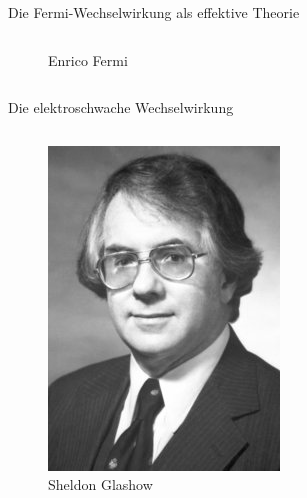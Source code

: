 \documentclass[aspectratio=1610, professionalfonts, 10pt]{beamer}
\begin{document}
\begin{frame}{Die Fermi-Wechselwirkung als effektive Theorie}
\begin{columns}
\begin{figure}
	  			\caption{Enrico Fermi \cite{wiki:fermi}}
	  			\label{fig:fermi}
			\end{figure}
	\end{columns}
\end{frame}

\begin{frame}{Die elektroschwache Wechselwirkung}
	\begin{columns}
			\begin{figure}
	  			\centering
				\includegraphics[width=\linewidth]{Images/glashow-13318-content-portrait-mobile-tiny.jpg}
	  			\caption{Sheldon Glashow}
	  			\label{fig:fermi}
			\end{figure}
			\begin{figure}
	  			\centering

\end{figure}
\end{columns}
\end{frame}
\end{document}
